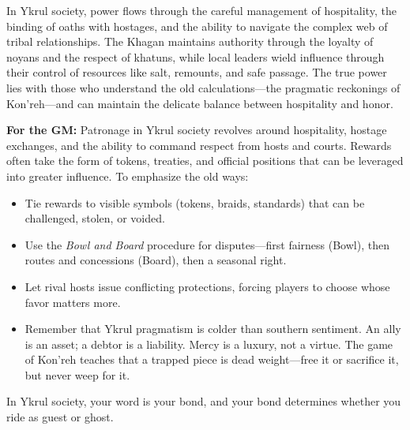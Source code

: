 \begin{tcolorbox}[colback=black!3,colframe=black!40!white,title={Patronage \& Power},breakable]
In Ykrul society, power flows through the careful management of hospitality, the binding of oaths with hostages, and the ability to navigate the complex web of tribal relationships. The Khagan maintains authority through the loyalty of noyans and the respect of khatuns, while local leaders wield influence through their control of resources like salt, remounts, and safe passage. The true power lies with those who understand the old calculations---the pragmatic reckonings of Kon'reh---and can maintain the delicate balance between hospitality and honor.

\textbf{For the GM:}  
Patronage in Ykrul society revolves around hospitality, hostage exchanges, and the ability to command respect from hosts and courts. Rewards often take the form of tokens, treaties, and official positions that can be leveraged into greater influence. To emphasize the old ways:
\begin{itemize}[nosep]
  \item Tie rewards to visible symbols (tokens, braids, standards) that can be challenged, stolen, or voided.
  \item Use the \emph{Bowl and Board} procedure for disputes---first fairness (Bowl), then routes and concessions (Board), then a seasonal right.
  \item Let rival hosts issue conflicting protections, forcing players to choose whose favor matters more.
  \item Remember that Ykrul pragmatism is colder than southern sentiment. An ally is an asset; a debtor is a liability. Mercy is a luxury, not a virtue. The game of Kon'reh teaches that a trapped piece is dead weight---free it or sacrifice it, but never weep for it.
\end{itemize}
In Ykrul society, your word is your bond, and your bond determines whether you ride as guest or ghost.
\end{tcolorbox}

